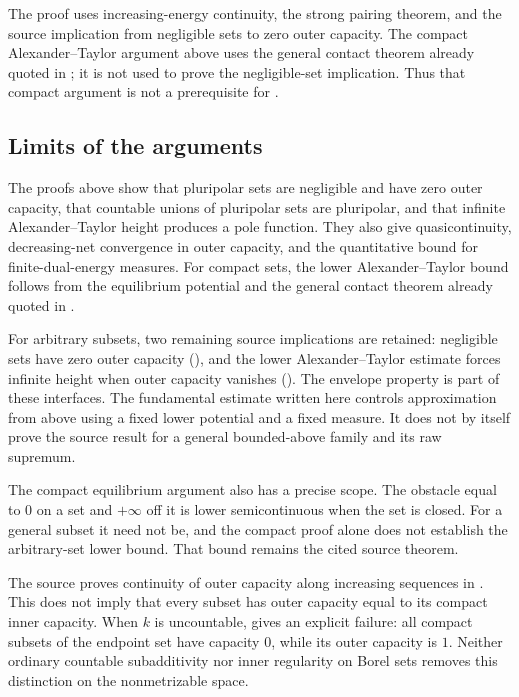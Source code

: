 \begin{remark}
\label{rem:ch48-logical-direction}
The proof uses increasing-energy continuity, the strong pairing theorem,
and the source implication from negligible sets to zero outer capacity.
The compact Alexander--Taylor argument above uses the general contact
theorem already quoted in ;
it is not used to prove the negligible-set implication.
Thus that compact argument is not a prerequisite for
.
\end{remark}

\subsection{Limits of the arguments}
\label{sec:ch48-what-is-open}

The proofs above show that pluripolar sets are negligible and have zero
outer capacity, that countable unions of pluripolar sets are pluripolar,
and that infinite Alexander--Taylor height produces a pole function.
They also give quasicontinuity, decreasing-net convergence in outer
capacity, and the quantitative bound for finite-dual-energy measures.
For compact sets, the lower Alexander--Taylor bound follows from the
equilibrium potential and the general contact theorem already quoted
in .

For arbitrary subsets, two remaining source implications are retained:
negligible sets have zero outer capacity
(\cite[Theorem~13.17]{BJ22}), and the lower Alexander--Taylor estimate
forces infinite height when outer capacity vanishes
(\cite[Theorem~13.14]{BJ22}). The envelope property is part of these
interfaces. The fundamental estimate written here controls approximation
from above using a fixed lower potential and a fixed measure.
It does not by itself prove the source result for a general
bounded-above family and its raw supremum.

The compact equilibrium argument also has a precise scope. The obstacle
equal to $0$ on a set and $+\infty$ off it is lower semicontinuous when
the set is closed. For a general subset it need not be, and the
compact proof alone does not establish the arbitrary-set lower bound.
That bound remains the cited source theorem.

The source proves continuity of outer capacity along increasing
sequences in \cite[Theorem~13.29]{BJ22}. This does not imply that every
subset has outer capacity equal to its compact inner capacity.
When $k$ is uncountable,
 gives an explicit failure:
all compact subsets of the endpoint set have capacity $0$, while
its outer capacity is $1$. Neither ordinary countable subadditivity
nor inner regularity on Borel sets removes this distinction on the
nonmetrizable space.

